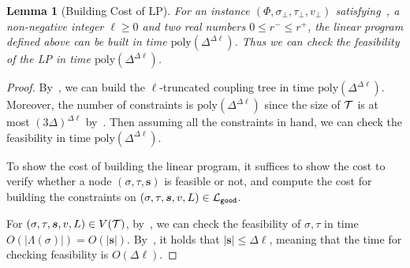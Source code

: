 \documentclass[11pt]{article}
\newtheorem{lemma}[theorem]{Lemma}
\newcommand{\abs}[1]{\left\vert#1\right\vert}
\def\!#1{\mathtt{#1}}
\def\poly{\mathrm{poly}}
\newcommand{\seqS}{\boldsymbol{s}}
\newcommand{\qgl}[1]{{\color{purple}{#1}}}
\begin{document}
\begin{lemma}[Building Cost of LP] \label{lem:building-cost-of-LP}
    For an instance $(\Phi, \sigma_\bot, \tau_\bot, v_\bot)$ satisfying~, a non-negative integer $\ell \ge 0$ and two real numbers $0 \le r^- \le r^+$,
    the linear program defined above can be built in time $\poly\left(\Delta^{\Delta \ell}\right)$. Thus we can check the feasibility of the LP in time $\poly\left(\Delta^{\Delta \ell}\right)$.
\end{lemma}
\begin{proof}
    By~, we can build the $\ell$-truncated coupling tree in time $\poly\left(\Delta^{\Delta \ell}\right)$. Moreover, the number of constraints is $\poly\left(\Delta^{\Delta \ell}\right)$ since the size of $\mathcal{T}$ is at most $(3\Delta)^{\Delta \ell}$ by~. Then assuming all the constraints in hand, we can check the feasibility in time $\poly\left(\Delta^{\Delta \ell}\right)$.
    
    To show the cost of building the linear program, it suffices to show the cost to verify whether a node $(\sigma, \tau, \seqS)$ is feasible or not, and compute the cost for building the constraints on $(\sigma, \tau, \seqS, v, L) \in \+L_{\!{good}}$.

    For $(\sigma, \tau, \seqS, v, L) \in V(\+T)$, by~, we can check the feasibility of $\sigma, \tau$ in time $O(\abs{\Lambda(\sigma)}) = O(\abs{\seqS})$. By~, it holds that $\abs{\seqS} \le \Delta \ell$, meaning that the time for checking feasibility is $O(\Delta \ell)$.
    

\end{proof}
\end{document}
